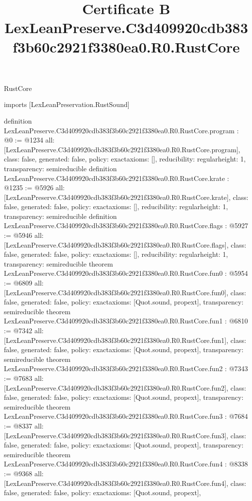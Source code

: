 \begin{lexlean}{RustCore}
\title{Certificate B LexLeanPreserve.C3d409920cdb383f3b60c2921f3380ea0.R0.RustCore}
\begin{coremodule}
imports [LexLeanPreservation.RustSound]

definition LexLeanPreserve.C3d409920cdb383f3b60c2921f3380ea0.R0.RustCore.program : @0 := @1234 {
  all: [LexLeanPreserve.C3d409920cdb383f3b60c2921f3380ea0.R0.RustCore.program],
  class: false,
  generated: false,
  policy: exact{axioms: []},
  reducibility: regular{height: 1},
  transparency: semireducible
}
definition LexLeanPreserve.C3d409920cdb383f3b60c2921f3380ea0.R0.RustCore.krate : @1235 := @5926 {
  all: [LexLeanPreserve.C3d409920cdb383f3b60c2921f3380ea0.R0.RustCore.krate],
  class: false,
  generated: false,
  policy: exact{axioms: []},
  reducibility: regular{height: 1},
  transparency: semireducible
}
definition LexLeanPreserve.C3d409920cdb383f3b60c2921f3380ea0.R0.RustCore.flags : @5927 := @5946 {
  all: [LexLeanPreserve.C3d409920cdb383f3b60c2921f3380ea0.R0.RustCore.flags],
  class: false,
  generated: false,
  policy: exact{axioms: []},
  reducibility: regular{height: 1},
  transparency: semireducible
}
theorem LexLeanPreserve.C3d409920cdb383f3b60c2921f3380ea0.R0.RustCore.fun0 : @5954 := @6809 {
  all: [LexLeanPreserve.C3d409920cdb383f3b60c2921f3380ea0.R0.RustCore.fun0],
  class: false,
  generated: false,
  policy: exact{axioms: [Quot.sound, propext]},
  transparency: semireducible
}
theorem LexLeanPreserve.C3d409920cdb383f3b60c2921f3380ea0.R0.RustCore.fun1 : @6810 := @7342 {
  all: [LexLeanPreserve.C3d409920cdb383f3b60c2921f3380ea0.R0.RustCore.fun1],
  class: false,
  generated: false,
  policy: exact{axioms: [Quot.sound, propext]},
  transparency: semireducible
}
theorem LexLeanPreserve.C3d409920cdb383f3b60c2921f3380ea0.R0.RustCore.fun2 : @7343 := @7683 {
  all: [LexLeanPreserve.C3d409920cdb383f3b60c2921f3380ea0.R0.RustCore.fun2],
  class: false,
  generated: false,
  policy: exact{axioms: [Quot.sound, propext]},
  transparency: semireducible
}
theorem LexLeanPreserve.C3d409920cdb383f3b60c2921f3380ea0.R0.RustCore.fun3 : @7684 := @8337 {
  all: [LexLeanPreserve.C3d409920cdb383f3b60c2921f3380ea0.R0.RustCore.fun3],
  class: false,
  generated: false,
  policy: exact{axioms: [Quot.sound, propext]},
  transparency: semireducible
}
theorem LexLeanPreserve.C3d409920cdb383f3b60c2921f3380ea0.R0.RustCore.fun4 : @8338 := @9368 {
  all: [LexLeanPreserve.C3d409920cdb383f3b60c2921f3380ea0.R0.RustCore.fun4],
  class: false,
  generated: false,
  policy: exact{axioms: [Quot.sound, propext]},
}
\end{coremodule}
\end{lexlean}
